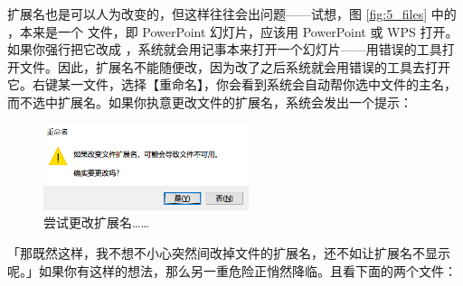 扩展名也是可以人为改变的，但这样往往会出问题——试想，图 \autoref{fig:5_files} 中的 ，本来是一个  文件，即 PowerPoint 幻灯片，应该用 PowerPoint 或 WPS 打开。如果你强行把它改成 ，系统就会用记事本来打开一个幻灯片——用错误的工具打开文件。因此，扩展名不能随便改，因为改了之后系统就会用错误的工具去打开它。右键某一文件，选择【重命名】，你会看到系统会自动帮你选中文件的主名，而不选中扩展名。如果你执意更改文件的扩展名，系统会发出一个提示：

\begin{figure}[htb!]
  \centering
  \includegraphics[width=6cm]{assets/basic/Warning_when_changing_extension.png}
  \caption{尝试更改扩展名……}
  \label{fig:Warning_when_changing_extension}
\end{figure}

「那既然这样，我不想不小心突然间改掉文件的扩展名，还不如让扩展名不显示呢。」如果你有这样的想法，那么另一重危险正悄然降临。且看下面的两个文件：

